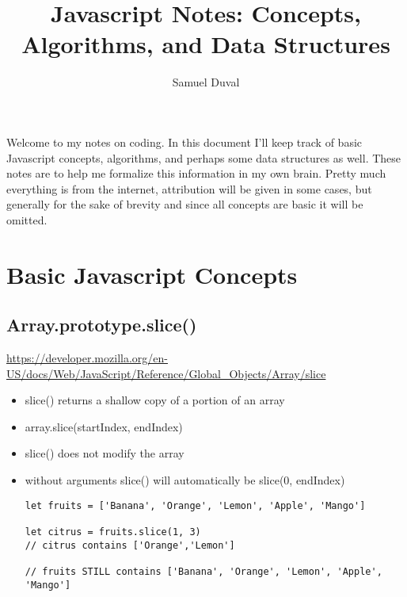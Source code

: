 \documentclass[10pt]{article}
\title{Javascript Notes: Concepts, Algorithms, and Data Structures}
\author{Samuel Duval}
\begin{document}
\maketitle

\pagebreak




Welcome to my notes on coding. In this document I'll keep track of basic Javascript concepts, algorithms, and perhaps some data structures as well. These notes are to help me formalize this information in my own brain. Pretty much everything is from the internet, attribution will be given in some cases, but generally for the sake of brevity and since all concepts are basic it will be omitted. 

\tableofcontents

\pagebreak

\section{Basic Javascript Concepts}

\medskip %
\subsection{Array.prototype.slice()}
\url{https://developer.mozilla.org/en-US/docs/Web/JavaScript/Reference/Global_Objects/Array/slice}

\begin{itemize}
	\item slice() returns a shallow copy of a portion of an array
	\item array.slice(startIndex, endIndex)
	\item slice() does not modify the array
	\item without arguments slice() will automatically be slice(0, endIndex)
	
\begin{lstlisting}[title=Example slice(), captionpos=t]
let fruits = ['Banana', 'Orange', 'Lemon', 'Apple', 'Mango']

let citrus = fruits.slice(1, 3)
// citrus contains ['Orange','Lemon']

// fruits STILL contains ['Banana', 'Orange', 'Lemon', 'Apple', 'Mango']

\end{lstlisting}
\end{itemize}
\medskip %
\end{document}
